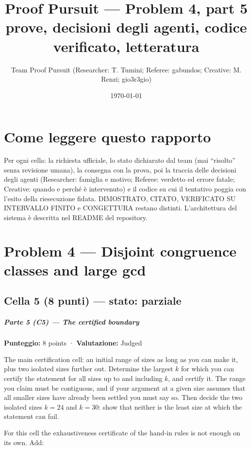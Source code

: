 \documentclass[11pt,a4paper]{article}
\title{Proof Pursuit --- Problem 4, part 5\\ \large prove, decisioni degli agenti, codice verificato, letteratura}
\author{Team Proof Pursuit (Researcher: T. Tumini; Referee: gabundos; Creative: M. Renzi; gio3r3gio)}
\date{\today}
\begin{document}
\maketitle\tableofcontents
\section*{Come leggere questo rapporto}
Per ogni cella: la richiesta ufficiale, lo stato dichiarato dal team (mai ``risolto'' senza revisione umana), la consegna
con la prova, poi la traccia delle decisioni degli agenti (Researcher: famiglia e motivo; Referee: verdetto ed errore
fatale; Creative: quando e perché è intervenuto) e il codice su cui il tentativo poggia con l'esito della riesecuzione
fidata. DIMOSTRATO, CITATO, VERIFICATO SU INTERVALLO FINITO e CONGETTURA restano distinti. L'architettura del sistema
è descritta nel README del repository.
\section{Problem 4 — Disjoint congruence classes and large gcd}
\subsection{Cella 5 (8 punti) — stato: parziale}
\subparagraph{Parte 5 (C5) --- The certified
boundary}\label{parte-5-c5-the-certified-boundary}

\textbf{Punteggio:} 8 points · \textbf{Valutazione:} Judged

The main certification cell: an initial range of sizes as long as you
can make it, plus two isolated sizes further out. Determine the largest
\(k\) for which you can certify the statement for all sizes up to and
including \(k\), and certify it. The range you claim must be contiguous,
and if your argument at a given size assumes that all smaller sizes have
already been settled you must say so. Then decide the two isolated sizes
\(k = 24\) and \(k = 30\): show that neither is the least size at which
the statement can fail.

For this cell the exhaustiveness certificate of the hand-in rules is not
enough on its own. Add:
\end{document}
